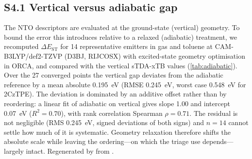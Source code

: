 \documentclass[final,3p,times,twocolumn]{elsarticle}
\begin{document}
\subsection*{S4.1 Vertical versus adiabatic gap}
The NTO descriptors are evaluated at the ground-state (vertical) geometry. To bound
the error this introduces relative to a relaxed (adiabatic) treatment, we recomputed
$\Delta E_\text{ST}$ for \num{14} representative emitters in gas and toluene at
CAM-B3LYP/def2-TZVP (D3BJ, RIJCOSX) with excited-state geometry optimisation in
ORCA, and compared with the vertical sTDA-xTB values (\cref{tab:adiabatic}). Over the
\num{27} converged points the vertical gap deviates from the adiabatic reference by a
mean absolute \qty{0.195}{\electronvolt} (RMSE \qty{0.245}{\electronvolt}, worst case
\qty{0.548}{\electronvolt} for 2CzTPE). The deviation is dominated by an additive offset
rather than by reordering: a linear fit of adiabatic on vertical gives slope \num{1.00}
and intercept \qty{0.07}{\electronvolt} ($R^2 = 0.70$), with rank correlation
Spearman $\rho = 0.71$. The residual is not negligible (RMS
\qty{0.245}{\electronvolt}, signed deviations of both signs) and $n = \num{14}$ cannot
settle how much of it is systematic. Geometry relaxation therefore shifts the absolute
scale while leaving the ordering---on which the triage use depends---largely intact.
Regenerated by  from
.
\end{document}
